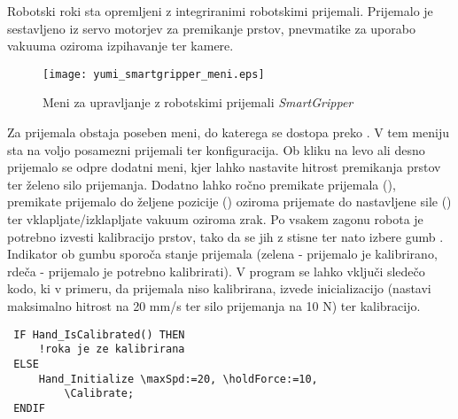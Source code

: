 Robotski roki sta opremljeni z integriranimi robotskimi prijemali. Prijemalo je sestavljeno iz servo motorjev za premikanje prstov, pnevmatike za uporabo vakuuma oziroma izpihavanje ter kamere.

\begin{figure}[!bht]
\centering
\texttt{[image: yumi\_smartgripper\_meni.eps]}
\caption{Meni za upravljanje z robotskimi prijemali \emph{SmartGripper}}
\label{fig:yumi_smart_meni}
\end{figure}

Za prijemala obstaja poseben meni, do katerega se dostopa preko . V tem meniju sta na voljo posamezni prijemali ter konfiguracija. Ob kliku na levo ali desno prijemalo se odpre dodatni meni, kjer lahko nastavite hitrost premikanja prstov ter želeno silo prijemanja. Dodatno lahko ročno premikate prijemala (), premikate prijemalo do željene pozicije () oziroma prijemate do nastavljene sile () ter vklapljate/izklapljate vakuum oziroma zrak. Po vsakem zagonu robota je potrebno izvesti kalibracijo prstov, tako da se jih z  stisne ter nato izbere gumb . Indikator ob gumbu sporoča stanje prijemala (zelena - prijemalo je kalibrirano, rdeča - prijemalo je potrebno kalibrirati). V program se lahko vključi sledečo kodo, ki v primeru, da prijemala niso kalibrirana, izvede inicializacijo (nastavi maksimalno hitrost na 20 mm/s ter silo prijemanja na 10 N) ter kalibracijo.



\begin{verbatim}
 IF Hand_IsCalibrated() THEN
     !roka je ze kalibrirana
 ELSE
     Hand_Initialize \maxSpd:=20, \holdForce:=10,
         \Calibrate;
 ENDIF
\end{verbatim}

